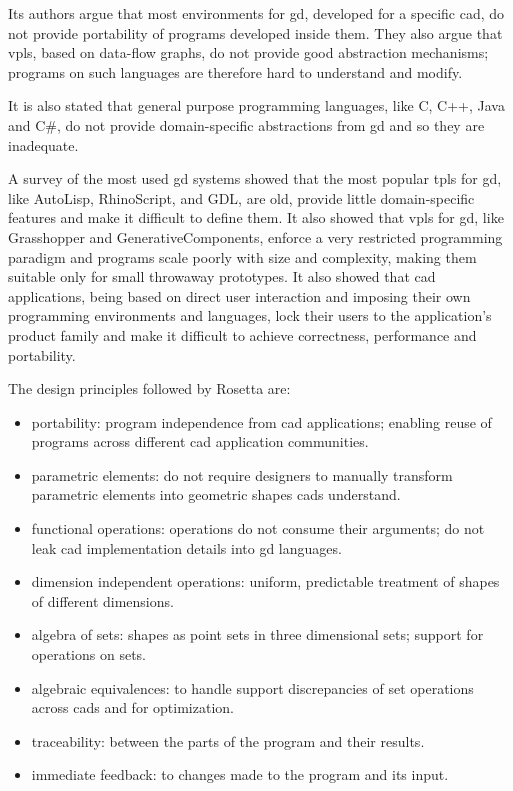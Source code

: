 \documentclass{./llncs2e/llncs}
\begin{document}
	Its authors argue that most environments for \ac{gd}, developed for a specific \ac{cad}, do not provide portability of programs developed inside them.
	They also argue that \ac{vpl}s, based on data-flow graphs, do not provide good abstraction mechanisms; programs on such languages are therefore hard to understand and modify.
	
	It is also stated that general purpose programming languages, like C, C++, Java and C\#, do not provide domain-specific abstractions from \ac{gd} and so they are inadequate.
	
	A survey of the most used \ac{gd} systems showed that the most popular \ac{tpl}s for \ac{gd}, like AutoLisp, RhinoScript, and GDL, are old, provide little domain-specific features and make it difficult to define them\cite{de2012modern,leitao2012programming}.
	It also showed that \ac{vpl}s for \ac{gd}, like Grasshopper and GenerativeComponents, enforce a very restricted programming paradigm and programs scale poorly with size and complexity, making them suitable only for small throwaway prototypes. 
	It also showed that \ac{cad} applications, being based on direct user interaction and imposing their own programming environments and languages, lock their users to the application's product family and make it difficult to achieve correctness, performance and portability.
	
	The design principles followed by Rosetta are:
	\begin{itemize}
		\item portability: program independence from \ac{cad} applications; enabling reuse of programs across different \ac{cad} application communities.
		\item parametric elements: do not require designers to manually transform parametric elements into geometric shapes \ac{cad}s understand.
		\item functional operations: operations do not consume their arguments; do not leak \ac{cad} implementation details into \ac{gd} languages.
		\item dimension independent operations: uniform, predictable treatment of shapes of different dimensions.
		\item algebra of sets: shapes as point sets in three dimensional sets; support for operations on sets.
		\item algebraic equivalences: to handle support discrepancies of set operations across \ac{cad}s and for optimization.
		\item traceability: between the parts of the program and their results.
		\item immediate feedback: to changes made to the program and its input.
	\end{itemize}
	
\end{document}
